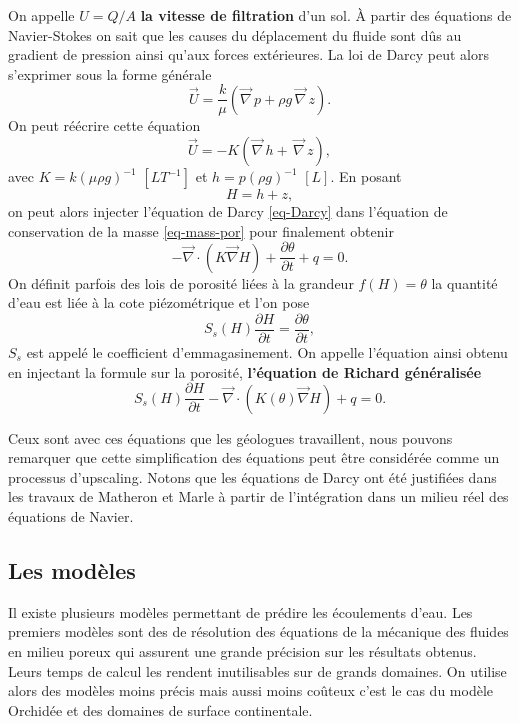 \documentclass[a4paper,10pt]{article}
\begin{document}
On appelle $U=Q/A$ \textbf{la vitesse de filtration} d'un sol. À partir des équations de Navier-Stokes on sait que les causes du déplacement du fluide sont dûs au gradient de pression ainsi qu'aux forces extérieures. La loi de Darcy peut alors s'exprimer sous la forme générale
\begin{equation}
	\label{eq-Darcy}
	\overrightarrow{U}=\frac{k}{\mu }(\overrightarrow{\nabla}\, p+\rho g \,\overrightarrow{\nabla}\, z).
\end{equation} 
On peut réécrire cette équation
\[\overrightarrow{U}=-K(\overrightarrow{\nabla}\, h + \,\overrightarrow{\nabla}\, z),\]
avec $K=k(\mu \rho g)^{-1}$ $[LT^{-1}]$ et $h=p(\rho g)^{-1}$ $[L]$. En posant 
\[H=h+z,\]
on peut alors injecter l'équation de Darcy \eqref{eq-Darcy} dans l'équation de conservation de la masse \eqref{eq-mass-por} pour finalement obtenir
\begin{equation}
	\label{eq-Richards}
	-\overrightarrow{\nabla} \cdot (K\overrightarrow{\nabla}H)+\frac{\partial\theta}{\partial t}+ q=0.
\end{equation}  
On définit parfois des lois de porosité liées à la grandeur $f(H)=\theta$ la quantité d'eau est liée à la cote piézométrique et l'on pose 
\[S_s(H)\frac{\partial H}{\partial t}=\frac{\partial\theta}{\partial t},\]
$S_s$ est appelé le coefficient d'emmagasinement. On appelle l'équation ainsi obtenu en injectant la formule sur la porosité, \textbf{l'équation de Richard généralisée}
\begin{equation}
	\label{eq-ge-richard}
	S_s(H)\frac{\partial H}{\partial t}-\overrightarrow{\nabla} \cdot (K(\theta)\overrightarrow{\nabla}H)+q=0.
\end{equation}

Ceux sont avec ces équations que les géologues travaillent, nous pouvons remarquer que cette simplification des équations peut être considérée comme un processus d'upscaling. Notons que les équations de Darcy ont été justifiées dans les travaux de Matheron et Marle à partir de l'intégration dans un milieu réel des équations de Navier. 


\subsection{Les modèles}
Il existe plusieurs modèles permettant de prédire les écoulements d'eau. Les premiers modèles sont des de résolution des équations de la mécanique des fluides en milieu poreux qui assurent une grande précision sur les résultats obtenus. Leurs temps de calcul les rendent inutilisables sur de grands domaines. On utilise alors des modèles moins précis mais aussi moins coûteux c'est le cas du modèle Orchidée et des domaines de surface continentale.
\end{document}
